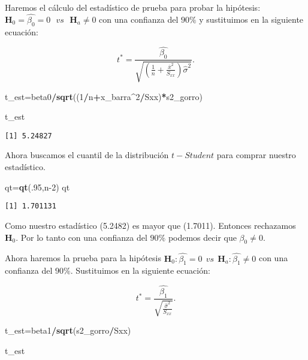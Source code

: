 \documentclass[
  a4paper,
  oneside,
  openany]{book}
\newenvironment{Shaded}{\begin{snugshade}}{\end{snugshade}}
\newcommand{\DecValTok}[1]{\textcolor[rgb]{0.00,0.00,0.81}{#1}}
\newcommand{\FunctionTok}[1]{\textcolor[rgb]{0.13,0.29,0.53}{\textbf{#1}}}
\newcommand{\NormalTok}[1]{#1}
\newcommand{\OtherTok}[1]{\textcolor[rgb]{0.56,0.35,0.01}{#1}}
\newcommand{\SpecialCharTok}[1]{\textcolor[rgb]{0.81,0.36,0.00}{\textbf{#1}}}
\begin{document}
Haremos el cálculo del estadístico de prueba para probar la hipótesis: \(\textbf{H}_0=\hat{\beta_{0}}=0 \ \ \ vs \ \ \ \textbf{H}_a \neq 0\) con una confianza del \(90\%\) y sustituimos en la siguiente ecuación:

\[t^*=\frac{\hat{\beta_{0}}}{\sqrt{\left(\frac{1}{n}+\frac{\overline{x}^2}{S_{xx}}\right)\hat{\sigma}^2}}.\]

\begin{Shaded}
\begin{Highlighting}[]
\NormalTok{t\_est}\OtherTok{=}\NormalTok{beta0}\SpecialCharTok{/}\FunctionTok{sqrt}\NormalTok{((}\DecValTok{1}\SpecialCharTok{/}\NormalTok{n}\SpecialCharTok{+}\NormalTok{x\_barra}\SpecialCharTok{\^{}}\DecValTok{2}\SpecialCharTok{/}\NormalTok{Sxx)}\SpecialCharTok{*}\NormalTok{s2\_gorro)}

\NormalTok{t\_est}
\end{Highlighting}
\end{Shaded}

\begin{verbatim}
[1] 5.24827
\end{verbatim}

Ahora buscamos el cuantil de la distribución \(t-Student\) para comprar nuestro estadístico.

\begin{Shaded}
\begin{Highlighting}[]
\NormalTok{qt}\OtherTok{=}\FunctionTok{qt}\NormalTok{(.}\DecValTok{95}\NormalTok{,n}\DecValTok{{-}2}\NormalTok{) }
\NormalTok{qt}
\end{Highlighting}
\end{Shaded}

\begin{verbatim}
[1] 1.701131
\end{verbatim}

Como nuestro estadístico (5.2482) es mayor que (1.7011). Entonces rechazamos \(\textbf{H}_0\). Por lo tanto con una confianza del \(90\%\) podemos decir que \(\beta_{0} \neq 0.\)

Ahora haremos la prueba para la hipótesis \(\textbf{H}_0:\hat{\beta_{1}}=0 \ \ vs \ \ \textbf{H}_{a}:\hat{\beta_{1}} \neq 0\) con una confianza del \(90\%\). Sustituimos en la siguiente ecuación:

\[t^*=\frac{\hat{\beta_{1}}}{\sqrt{\frac{\hat{\sigma}^2}{S_{xx}}}}.\]

\begin{Shaded}
\begin{Highlighting}[]
\NormalTok{t\_est}\OtherTok{=}\NormalTok{beta1}\SpecialCharTok{/}\FunctionTok{sqrt}\NormalTok{(s2\_gorro}\SpecialCharTok{/}\NormalTok{Sxx)}

\NormalTok{t\_est}
\end{Highlighting}
\end{Shaded}
\end{document}
